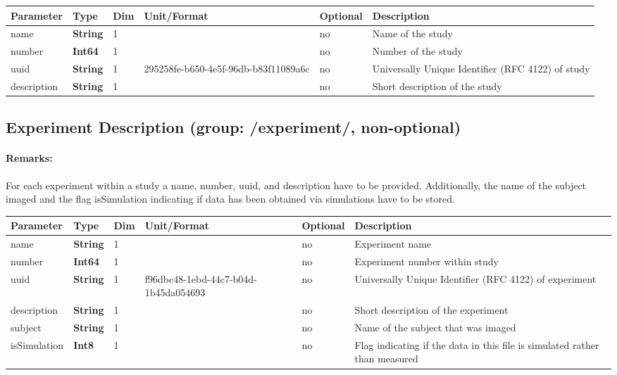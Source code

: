 \documentclass[landscape,a4paper]{article} %
\newcommand{\inltab}[1]{{\ttfamily\bfseries\color{blue}#1}}
\newcommand{\inlvar}[1]{{\ttfamily#1}}
\begin{document}
\noindent \begin{tabularx}{\columnwidth}{lllllX} 
\textbf{Parameter} & \textbf{Type} & \textbf{Dim} & \textbf{Unit/Format} & \textbf{Optional} & \textbf{Description} \\ \hline 
\inlvar{name} & \inltab{String} & 1 & & no & Name of the study \\ \hline
\inlvar{number} & \inltab{Int64} & 1 & & no & Number of the study\\ \hline
\inlvar{uuid} & \inltab{String} & 1 & 295258fe-b650-4e5f-96db-b83f11089a6c & no & Universally Unique Identifier (RFC 4122) of study \\ \hline 
\inlvar{description} & \inltab{String} & 1 & & no & Short description of the study \\ \hline
\end{tabularx}


\subsection{Experiment Description (group: \inlvar{/experiment/}, non-optional)}

\begin{multicols}{2}
\paragraph{Remarks:} For each experiment within a study a \inlvar{name}, \inlvar{number}, \inlvar{uuid}, and \inlvar{description} have to be provided. Additionally, the name of the \inlvar{subject} imaged and the flag \inlvar{isSimulation} indicating if data has been obtained via simulations have to be stored.
\end{multicols}

\noindent \begin{tabularx}{\columnwidth}{lllllX} 
\textbf{Parameter} & \textbf{Type} & \textbf{Dim} & \textbf{Unit/Format} & \textbf{Optional} & \textbf{Description} \\ \hline 
\inlvar{name} & \inltab{String} & 1 & & no & Experiment name \\ \hline
\inlvar{number} & \inltab{Int64} & 1 & & no & Experiment number within study\\ \hline
\inlvar{uuid} & \inltab{String} & 1 & f96dbc48-1ebd-44c7-b04d-1b45da054693 & no & Universally Unique Identifier (RFC 4122) of experiment \\ \hline 
\inlvar{description} & \inltab{String} & 1 & & no & Short description of the experiment \\ \hline
\inlvar{subject} & \inltab{String} & 1 & & no & Name of the subject that was imaged \\ \hline 
\inlvar{isSimulation} & \inltab{Int8} & 1 & & no & Flag indicating if the data in this file is simulated rather than measured \\ \hline
\end{tabularx}
\end{document}
